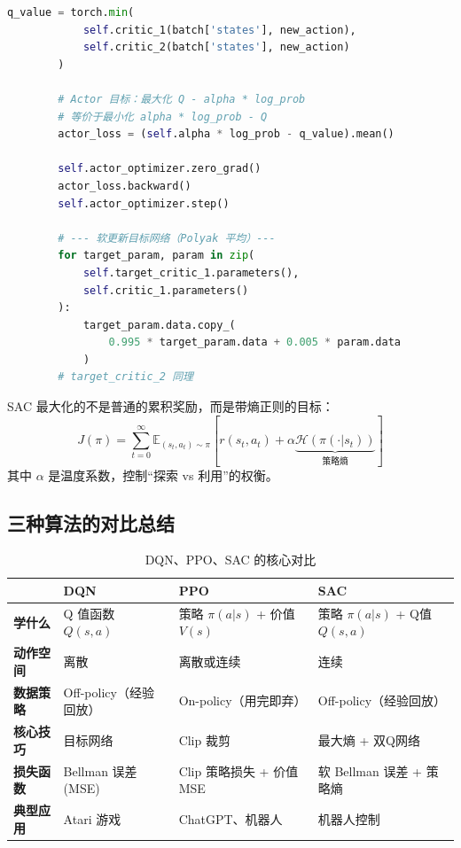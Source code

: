 \begin{lstlisting}[language=Python, caption={SAC 核心算法}]
        q_value = torch.min(
            self.critic_1(batch['states'], new_action),
            self.critic_2(batch['states'], new_action)
        )
        
        # Actor 目标：最大化 Q - alpha * log_prob
        # 等价于最小化 alpha * log_prob - Q
        actor_loss = (self.alpha * log_prob - q_value).mean()
        
        self.actor_optimizer.zero_grad()
        actor_loss.backward()
        self.actor_optimizer.step()
        
        # --- 软更新目标网络（Polyak 平均）---
        for target_param, param in zip(
            self.target_critic_1.parameters(),
            self.critic_1.parameters()
        ):
            target_param.data.copy_(
                0.995 * target_param.data + 0.005 * param.data
            )
        # target_critic_2 同理
\end{lstlisting}

\begin{keyidea}
SAC 最大化的不是普通的累积奖励，而是带熵正则的目标：
\begin{equation}
    J(\pi) = \sum_{t=0}^{\infty} \mathbb{E}_{(s_t, a_t) \sim \pi} \left[ r(s_t, a_t) + \alpha \underbrace{\mathcal{H}(\pi(\cdot|s_t))}_{\text{策略熵}} \right]
\end{equation}
其中 $\alpha$ 是温度系数，控制“探索 vs 利用”的权衡。
\end{keyidea}

\subsection{三种算法的对比总结}

\begin{table}[htbp]
\centering
\small
\renewcommand{\arraystretch}{1.4}
\caption{DQN、PPO、SAC 的核心对比}
\begin{tabularx}{\textwidth}{p{1.8cm}|X|X|X}
\toprule
& \textbf{DQN} & \textbf{PPO} & \textbf{SAC} \\
\midrule
\textbf{学什么} & Q 值函数 $Q(s,a)$ & 策略 $\pi(a|s)$ + 价值 $V(s)$ & 策略 $\pi(a|s)$ + Q值 $Q(s,a)$ \\
\midrule
\textbf{动作空间} & 离散 & 离散或连续 & 连续 \\
\midrule
\textbf{数据策略} & Off-policy（经验回放） & On-policy（用完即弃） & Off-policy（经验回放） \\
\midrule
\textbf{核心技巧} & 目标网络 & Clip 裁剪 & 最大熵 + 双Q网络 \\
\midrule
\textbf{损失函数} & Bellman 误差 (MSE) & Clip 策略损失 + 价值 MSE & 软 Bellman 误差 + 策略熵 \\
\midrule
\textbf{典型应用} & Atari 游戏 & ChatGPT、机器人 & 机器人控制 \\
\bottomrule
\end{tabularx}
\end{table}

